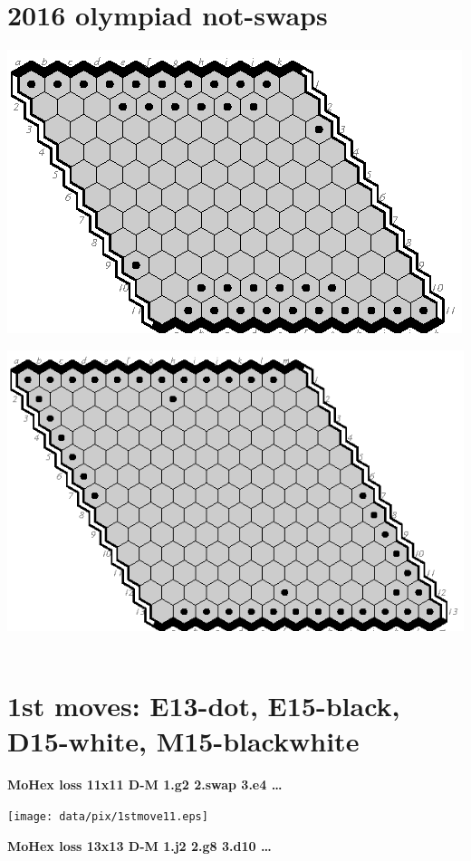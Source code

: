 \documentclass{article}
\begin{document}
\section*{2016 olympiad not-swaps}

\vfill\vfill\vfill

\includegraphics[scale=2]{data/pix/swaps11.eps}\vfill\vfill

\includegraphics[scale=2]{data/pix/swaps13.eps}\vfill\vfill\vfill~
\newpage
\section*{1st moves: E13-dot, E15-black, D15-white, M15-blackwhite}
\vfill

{\large\bf MoHex loss 11x11 D-M 1.g2 2.swap 3.e4 \ldots}
\vfill\vfill

\texttt{[image: data/pix/1stmove11.eps]}\vfill\vfill

{\large\bf MoHex loss 13x13 D-M 1.j2 2.g8 3.d10 \ldots}
\end{document}
